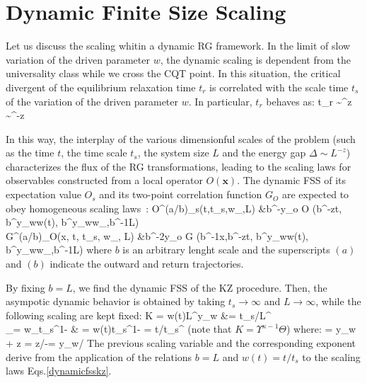 \section{Dynamic Finite Size Scaling}

Let us discuss the scaling whitin a dynamic RG framework. In the limit of slow variation
of the driven parameter $w$, the dynamic scaling is dependent from the universality class
while we cross the CQT point. In this situation, the critical divergent of the equilibrium
relaxation time $t_r$ is correlated with the scale time $t_s$ of the variation of the
driven parameter $w$. 
In particular, $t_r$ behaves as: 
	t_r \sim \xi^{z} \sim {}^{-z\nu} \pt
\ee

In this way, the interplay of the various dimensionful scales of the problem (such as the 
time $t$, the time scale $t_s$, the system size $L$ and the energy gap 
$\Delta \sim L^{-z}$) characterizes the flux of the RG transformations, leading to the 
scaling laws for observables constructed from a local operator $O({\bm x})$.
The dynamic FSS of its expectation value $O_s$ and its two-point correlation
function $G_O$ are expected to obey homogeneous scaling laws~\cite{rossini2021coherent}:
	O^{(a/b)}_s(t,t_s,w_\star,L) &\simeq  b^{-y_o} {\cal O}
				(b^{-z}t, b^{y_w}w(t), b^{y_w}w_\star,b^{-1}L) \cm \\
	G^{(a/b)}_O(\bm x, t, t_s, w_\star, L) &\simeq  b^{-2y_o} {\cal G}
			(b^{-1}\bm x,b^{-z}t, b^{y_w}w(t), b^{y_w}w_\star,b^{-1}L) \pc
\ea
where $b$ is an arbitrary lenght scale and the superscripts $(a)$ and $(b)$ indicate the
outward and return trajectories.

By fixing $b = L$, we find the dynamic FSS of the KZ procedure. Then, the asympotic
dynamic behavior is obtained by taking $t_s \to \infty$ and $L \to \infty$, while the
following scaling are kept fixed:
	K = w(t)L^{y_w} \cm &\qquad \Upsilon = t_s/L^{\zeta}\cm \\
	\Theta_\star = w_\star t_s^{1-\kappa} \cm &\qquad \Theta 
				= w(t)t_s^{1-\kappa} = t/t_s^\kappa \cm
\ea
(note that $K = \Upsilon^{\kappa-1}\Theta$) where:
	\zeta = y_w + z \cm \quad \kappa = z/\zeta \cm {}-\kappa = y_w/\zeta \pt
\ea
The previous scaling variable and the corresponding exponent derive from the application
of the relations $b=L$ and $w(t)=t/t_s$ to the scaling laws Eqs.\eqref{dynamicfsskz}.\\

